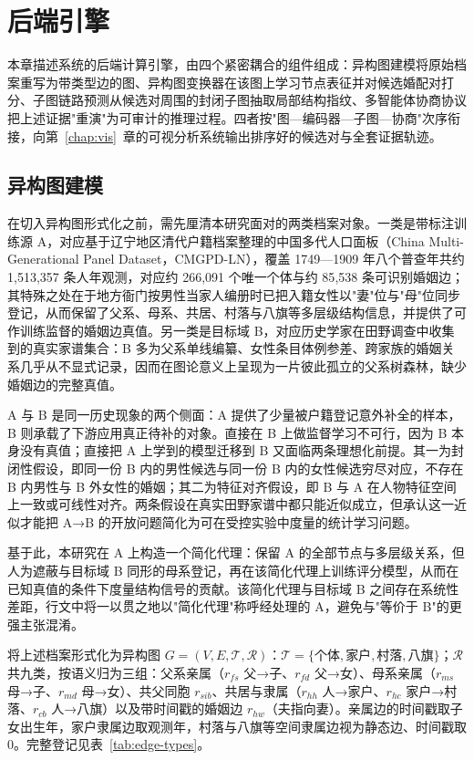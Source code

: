 \chapter{后端引擎}\label{chap:backend}

本章描述系统的后端计算引擎，由四个紧密耦合的组件组成：异构图建模将原始档案重写为带类型边的图、异构图变换器在该图上学习节点表征并对候选婚配对打分、子图链路预测从候选对周围的封闭子图抽取局部结构指纹、多智能体协商协议把上述证据"重演"为可审计的推理过程。四者按"图—编码器—子图—协商"次序衔接，向第~\ref{chap:vis}~章的可视分析系统输出排序好的候选对与全套证据轨迹。

\section{异构图建模}\label{sec:backend-graph}

在切入异构图形式化之前，需先厘清本研究面对的两类档案对象。一类是带标注训练源 A，对应基于辽宁地区清代户籍档案整理的中国多代人口面板（China Multi-Generational Panel Dataset，CMGPD-LN）\citep{campbell2011data,zhao2001chinese}，覆盖 1749—1909 年八个普查年共约 1{,}513{,}357 条人年观测，对应约 266{,}091 个唯一个体与约 85{,}538 条可识别婚姻边；其特殊之处在于地方衙门按男性当家人编册时已把入籍女性以"妻"位与"母"位同步登记，从而保留了父系、母系、共居、村落与八旗等多层级结构信息，并提供了可作训练监督的婚姻边真值。另一类是目标域 B，对应历史学家在田野调查中收集到的真实家谱集合：B 多为父系单线编纂、女性条目体例参差、跨家族的婚姻关系几乎从不显式记录，因而在图论意义上呈现为一片彼此孤立的父系树森林，缺少婚姻边的完整真值。

A 与 B 是同一历史现象的两个侧面：A 提供了少量被户籍登记意外补全的样本，B 则承载了下游应用真正待补的对象。直接在 B 上做监督学习不可行，因为 B 本身没有真值；直接把 A 上学到的模型迁移到 B 又面临两条理想化前提。其一为封闭性假设，即同一份 B 内的男性候选与同一份 B 内的女性候选穷尽对应，不存在 B 内男性与 B 外女性的婚姻；其二为特征对齐假设，即 B 与 A 在人物特征空间上一致或可线性对齐。两条假设在真实田野家谱中都只能近似成立，但承认这一近似才能把 A→B 的开放问题简化为可在受控实验中度量的统计学习问题。

基于此，本研究在 A 上构造一个简化代理：保留 A 的全部节点与多层级关系，但人为遮蔽与目标域 B 同形的母系登记，再在该简化代理上训练评分模型，从而在已知真值的条件下度量结构信号的贡献。该简化代理与目标域 B 之间存在系统性差距，行文中将一以贯之地以"简化代理"称呼经处理的 A，避免与"等价于 B"的更强主张混淆。

将上述档案形式化为异构图 \(G=(V,E,\mathcal{T},\mathcal{R})\)：\(\mathcal{T}=\{\text{个体},\text{家户},\text{村落},\text{八旗}\}\)；\(\mathcal{R}\) 共九类，按语义归为三组：父系亲属（\(r_{fs}\) 父→子、\(r_{fd}\) 父→女）、母系亲属（\(r_{ms}\) 母→子、\(r_{md}\) 母→女）、共父同胞 \(r_{sib}\)、共居与隶属（\(r_{hh}\) 人→家户、\(r_{hc}\) 家户→村落、\(r_{cb}\) 人→八旗）以及带时间戳的婚姻边 \(r_{hw}\)（夫指向妻）。亲属边的时间戳取子女出生年，家户隶属边取观测年，村落与八旗等空间隶属边视为静态边、时间戳取 0。完整登记见表~\ref{tab:edge-types}。

